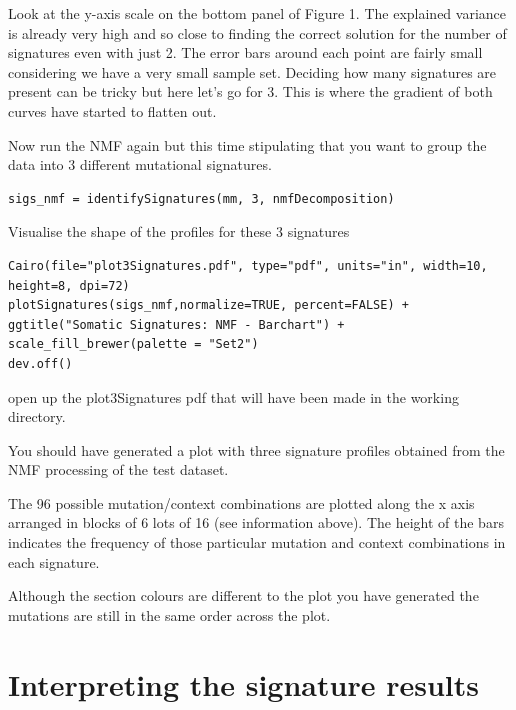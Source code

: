 Look at the y-axis scale on the bottom panel of Figure 1.
The explained variance is already very high and so close to finding
the correct solution for the number of signatures even with just 2.
The error bars around each point are fairly small considering we have
a very small sample set. Deciding how many signatures are present can
be tricky but here let's go for 3.
This is where the gradient of both curves have started to flatten out.
\vspace{4 mm}
\begin{steps}
Now run the NMF again but this time stipulating that you want to group the data into 3 different mutational signatures.
\begin{lstlisting}
sigs_nmf = identifySignatures(mm, 3, nmfDecomposition)
\end{lstlisting}

Visualise the shape of the profiles for these 3 signatures
\begin{lstlisting}
Cairo(file="plot3Signatures.pdf", type="pdf", units="in", width=10, height=8, dpi=72)
plotSignatures(sigs_nmf,normalize=TRUE, percent=FALSE) + ggtitle("Somatic Signatures: NMF - Barchart") + scale_fill_brewer(palette = "Set2")
dev.off()
\end{lstlisting}

open up the plot3Signatures pdf that will have been made in the working directory.
\end{steps}

\begin {information}
You should have generated a plot with three signature profiles obtained from the NMF processing
of the test dataset.

The 96 possible mutation/context combinations are plotted along the x
axis arranged in blocks of 6 lots of 16 (see information above).
The height of the bars indicates the frequency of those particular
mutation and context combinations in each signature.

Although the section colours are different to the plot you have generated the
mutations are still in the same order across the plot. 
\end{information}

\section{Interpreting the signature results}

